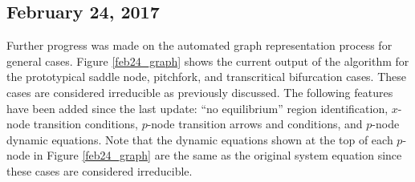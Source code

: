 \documentclass[12pt]{article}
\begin{document}
\subsection{February 24, 2017}
Further progress was made on the automated graph representation process for general cases. Figure \ref{feb24_graph} shows the current output of the algorithm for the prototypical saddle node, pitchfork, and transcritical bifurcation cases. These cases are considered irreducible as previously discussed. The following features have been added since the last update: ``no equilibrium'' region identification, $x$-node transition conditions, $p$-node transition arrows and conditions, and $p$-node dynamic equations. Note that the dynamic equations shown at the top of each $p$-node in Figure \ref{feb24_graph} are the same as the original system equation since these cases are considered irreducible.
\end{document}
